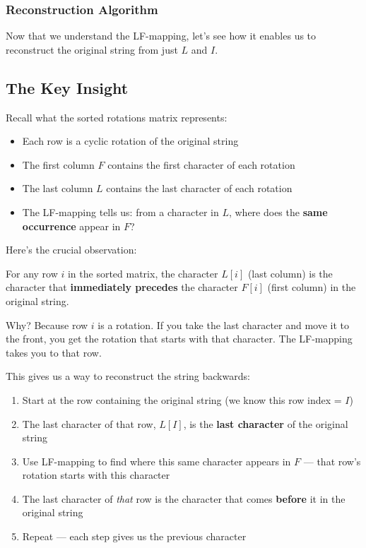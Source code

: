 \subsubsection{Reconstruction Algorithm}

Now that we understand the LF-mapping, let's see how it enables us to reconstruct the original string from just \(L\) and \(I\).

\subsection*{The Key Insight}

Recall what the sorted rotations matrix represents:
\begin{itemize}
    \item Each row is a cyclic rotation of the original string
    \item The first column \(F\) contains the first character of each rotation
    \item The last column \(L\) contains the last character of each rotation
    \item The LF-mapping tells us: from a character in \(L\), where does the \textbf{same occurrence} appear in \(F\)?
\end{itemize}

Here's the crucial observation:

\begin{importantbox}
For any row \(i\) in the sorted matrix, the character \(L[i]\) (last column) is the character that \textbf{immediately precedes} the character \(F[i]\) (first column) in the original string.

Why? Because row \(i\) is a rotation. If you take the last character and move it to the front, you get the rotation that starts with that character. The LF-mapping takes you to that row.
\end{importantbox}

This gives us a way to reconstruct the string backwards:

\begin{enumerate}
    \item Start at the row containing the original string (we know this row index = \(I\))
    \item The last character of that row, \(L[I]\), is the \textbf{last character} of the original string
    \item Use LF-mapping to find where this same character appears in \(F\) — that row's rotation starts with this character
    \item The last character of \textit{that} row is the character that comes \textbf{before} it in the original string
    \item Repeat — each step gives us the previous character
\end{enumerate}

